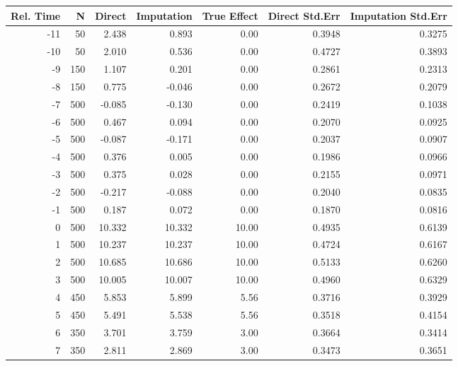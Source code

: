 \begin{tabular}{rrrrrrr}
\toprule
 Rel. Time &   N &  Direct &  Imputation &  True Effect &  Direct Std.Err &  Imputation Std.Err \\
\midrule
       -11 &  50 &   2.438 &       0.893 &         0.00 &          0.3948 &              0.3275 \\
       -10 &  50 &   2.010 &       0.536 &         0.00 &          0.4727 &              0.3893 \\
        -9 & 150 &   1.107 &       0.201 &         0.00 &          0.2861 &              0.2313 \\
        -8 & 150 &   0.775 &      -0.046 &         0.00 &          0.2672 &              0.2079 \\
        -7 & 500 &  -0.085 &      -0.130 &         0.00 &          0.2419 &              0.1038 \\
        -6 & 500 &   0.467 &       0.094 &         0.00 &          0.2070 &              0.0925 \\
        -5 & 500 &  -0.087 &      -0.171 &         0.00 &          0.2037 &              0.0907 \\
        -4 & 500 &   0.376 &       0.005 &         0.00 &          0.1986 &              0.0966 \\
        -3 & 500 &   0.375 &       0.028 &         0.00 &          0.2155 &              0.0971 \\
        -2 & 500 &  -0.217 &      -0.088 &         0.00 &          0.2040 &              0.0835 \\
        -1 & 500 &   0.187 &       0.072 &         0.00 &          0.1870 &              0.0816 \\
         0 & 500 &  10.332 &      10.332 &        10.00 &          0.4935 &              0.6139 \\
         1 & 500 &  10.237 &      10.237 &        10.00 &          0.4724 &              0.6167 \\
         2 & 500 &  10.685 &      10.686 &        10.00 &          0.5133 &              0.6260 \\
         3 & 500 &  10.005 &      10.007 &        10.00 &          0.4960 &              0.6329 \\
         4 & 450 &   5.853 &       5.899 &         5.56 &          0.3716 &              0.3929 \\
         5 & 450 &   5.491 &       5.538 &         5.56 &          0.3518 &              0.4154 \\
         6 & 350 &   3.701 &       3.759 &         3.00 &          0.3664 &              0.3414 \\
         7 & 350 &   2.811 &       2.869 &         3.00 &          0.3473 &              0.3651 \\
\bottomrule
\end{tabular}
